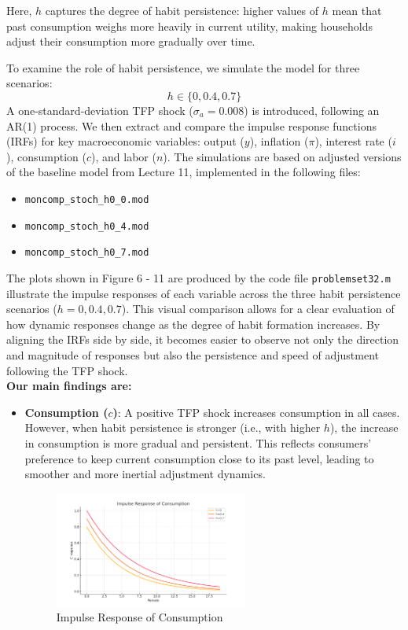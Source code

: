 \documentclass[12pt,a4paper,notitlepage]{article}
\numberwithin{equation}{section}
\begin{document}
\begin{itemize}
\begin{itemize}
Here, \( h \) captures the degree of habit persistence: higher values of \( h \) mean that past consumption weighs more heavily in current utility, making households adjust their consumption more gradually over time.

To examine the role of habit persistence, we simulate the model for three scenarios:
\[
h \in \{0, 0.4, 0.7\}
\]
A one-standard-deviation TFP shock (\( \sigma_a = 0.008 \)) is introduced, following an AR(1) process. We then extract and compare the impulse response functions (IRFs) for key macroeconomic variables: output (\( y \)), inflation (\( \pi \)), interest rate (\( i \)), consumption (\( c \)), and labor (\( n \)). The simulations are based on adjusted versions of the baseline model from Lecture 11, implemented in the following files:
\begin{itemize}
  \item \texttt{moncomp\_stoch\_h0\_0.mod}
  \item \texttt{moncomp\_stoch\_h0\_4.mod}
  \item \texttt{moncomp\_stoch\_h0\_7.mod}
\end{itemize}

\vspace{2em}

The plots shown in Figure 6 - 11 are produced by the code file \texttt{problemset32.m} illustrate the impulse responses of each variable across the three habit persistence scenarios (\( h = 0, 0.4, 0.7 \)). This visual comparison allows for a clear evaluation of how dynamic responses change as the degree of habit formation increases. By aligning the IRFs side by side, it becomes easier to observe not only the direction and magnitude of responses but also the persistence and speed of adjustment following the TFP shock.\\
\textbf{Our main findings are:}

\begin{itemize}
  \item \textbf{Consumption (\( c \))}: A positive TFP shock increases consumption in all cases. However, when habit persistence is stronger (i.e., with higher \( h \)), the increase in consumption is more gradual and persistent. This reflects consumers’ preference to keep current consumption close to its past level, leading to smoother and more inertial adjustment dynamics.


\begin{figure}[H]
  \centering
  \includegraphics[width=0.6\textwidth]{IRF_Consumption.png}
  \caption{Impulse Response of Consumption}
\end{figure}


\end{itemize}
\end{itemize}
\end{itemize}
\end{document}
